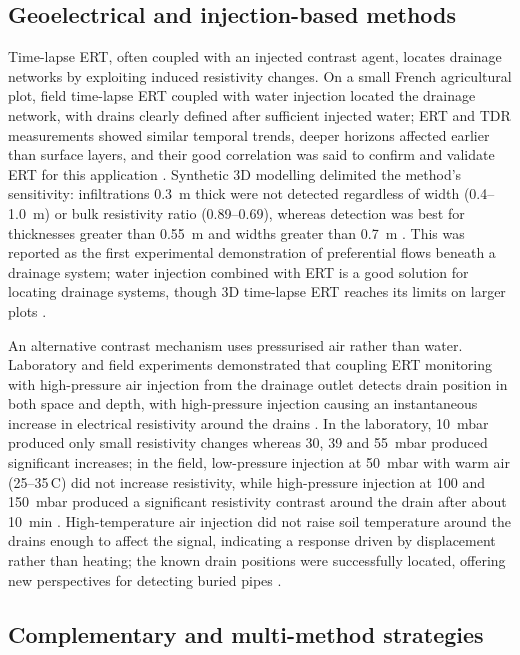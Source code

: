 \subsection{Geoelectrical and injection-based methods}

Time-lapse ERT, often coupled with an injected contrast agent, locates drainage networks by exploiting induced resistivity changes. On a small French agricultural plot, field time-lapse ERT coupled with water injection located the drainage network, with drains clearly defined after sufficient injected water; ERT and TDR measurements showed similar temporal trends, deeper horizons affected earlier than surface layers, and their good correlation was said to confirm and validate ERT for this application \parencite{Jouen2018}. Synthetic 3D modelling delimited the method's sensitivity: infiltrations 0.3~m thick were not detected regardless of width (0.4--1.0~m) or bulk resistivity ratio (0.89--0.69), whereas detection was best for thicknesses greater than 0.55~m and widths greater than 0.7~m \parencite{Jouen2018}. This was reported as the first experimental demonstration of preferential flows beneath a drainage system; water injection combined with ERT is a good solution for locating drainage systems, though 3D time-lapse ERT reaches its limits on larger plots \parencite{Jouen2018}.

An alternative contrast mechanism uses pressurised air rather than water. Laboratory and field experiments demonstrated that coupling ERT monitoring with high-pressure air injection from the drainage outlet detects drain position in both space and depth, with high-pressure injection causing an instantaneous increase in electrical resistivity around the drains \parencite{Henine2021}. In the laboratory, 10~mbar produced only small resistivity changes whereas 30, 39 and 55~mbar produced significant increases; in the field, low-pressure injection at 50~mbar with warm air (25--35\,\textdegree C) did not increase resistivity, while high-pressure injection at 100 and 150~mbar produced a significant resistivity contrast around the drain after about 10~min \parencite{Henine2021}. High-temperature air injection did not raise soil temperature around the drains enough to affect the signal, indicating a response driven by displacement rather than heating; the known drain positions were successfully located, offering new perspectives for detecting buried pipes \parencite{Henine2021}.

\subsection{Complementary and multi-method strategies}

